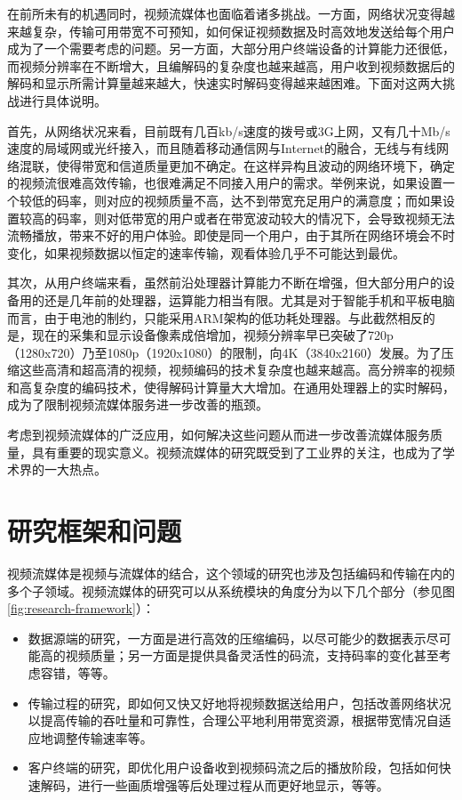 在前所未有的机遇同时，视频流媒体也面临着诸多挑战。一方面，网络状况变得越来越复杂，传输可用带宽不可预知，如何保证视频数据及时高效地发送给每个用户成为了一个需要考虑的问题。另一方面，大部分用户终端设备的计算能力还很低，而视频分辨率在不断增大，且编解码的复杂度也越来越高，用户收到视频数据后的解码和显示所需计算量越来越大，快速实时解码变得越来越困难。下面对这两大挑战进行具体说明。

首先，从网络状况来看，目前既有几百kb/s速度的拨号或3G上网，又有几十Mb/s速度的局域网或光纤接入，而且随着移动通信网与Internet的融合，无线与有线网络混联，使得带宽和信道质量更加不确定。在这样异构且波动的网络环境下，确定的视频流很难高效传输，也很难满足不同接入用户的需求。举例来说，如果设置一个较低的码率，则对应的视频质量不高，达不到带宽充足用户的满意度；而如果设置较高的码率，则对低带宽的用户或者在带宽波动较大的情况下，会导致视频无法流畅播放，带来不好的用户体验。即使是同一个用户，由于其所在网络环境会不时变化，如果视频数据以恒定的速率传输，观看体验几乎不可能达到最优。

其次，从用户终端来看，虽然前沿处理器计算能力不断在增强，但大部分用户的设备用的还是几年前的处理器，运算能力相当有限。尤其是对于智能手机和平板电脑而言，由于电池的制约，只能采用ARM架构的低功耗处理器。与此截然相反的是，现在的采集和显示设备像素成倍增加，视频分辨率早已突破了720p（1280x720）乃至1080p（1920x1080）的限制，向4K（3840x2160）发展。为了压缩这些高清和超高清的视频，视频编码的技术复杂度也越来越高。高分辨率的视频和高复杂度的编码技术，使得解码计算量大大增加。在通用处理器上的实时解码，成为了限制视频流媒体服务进一步改善的瓶颈。

考虑到视频流媒体的广泛应用，如何解决这些问题从而进一步改善流媒体服务质量，具有重要的现实意义。视频流媒体的研究既受到了工业界的关注，也成为了学术界的一大热点。

\section{研究框架和问题}

视频流媒体是视频与流媒体的结合，这个领域的研究也涉及包括编码和传输在内的多个子领域。视频流媒体的研究可以从系统模块的角度分为以下几个部分（参见图\ref{fig:research-framework}）：
\begin{itemize}
	\item 数据源端的研究，一方面是进行高效的压缩编码，以尽可能少的数据表示尽可能高的视频质量；另一方面是提供具备灵活性的码流，支持码率的变化甚至考虑容错，等等。
	\item 传输过程的研究，即如何又快又好地将视频数据送给用户，包括改善网络状况以提高传输的吞吐量和可靠性，合理公平地利用带宽资源，根据带宽情况自适应地调整传输速率等。
	\item 客户终端的研究，即优化用户设备收到视频码流之后的播放阶段，包括如何快速解码，进行一些画质增强等后处理过程从而更好地显示，等等。
\end{itemize}

